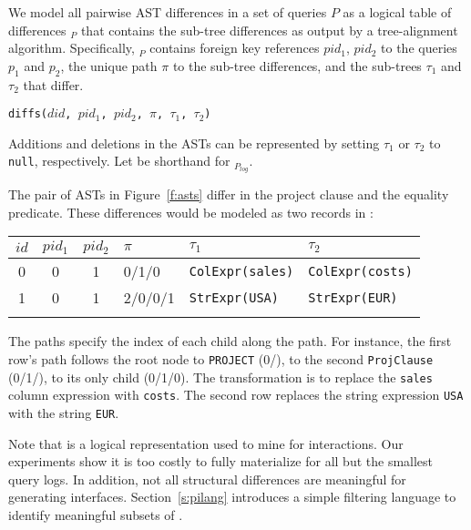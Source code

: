 We model all pairwise AST differences in a set of queries $P$ as a logical table of differences \difftablens$_P$ that contains the sub-tree differences as output by a tree-alignment algorithm.  Specifically, \difftablens$_P$ contains foreign key references $pid_1$, $pid_2$ to the queries $p_1$ and $p_2$, the unique path $\pi$ to the sub-tree differences, and the sub-trees $\tau_1$ and $\tau_2$ that differ.
{\small
  \begin{center}
    \texttt{diffs($did$, $pid_1$, $pid_2$, $\pi$, $\tau_1$, $\tau_2$)}
  \end{center}
}
Additions and deletions in the ASTs can be represented by setting $\tau_1$ or $\tau_2$ to \texttt{null}, respectively. Let \difftable be shorthand for \difftablens$_{P_{log}}$.
\begin{example}\label{e:asts}
The pair of ASTs in Figure~\ref{f:asts} differ in the project clause and the equality predicate.  These differences would be modeled as two records in \difftable:
\begin{center}\small
\hspace*{-.1in}
        \begin{tabular}{ccclll}
            \toprule
            $id$ & \textbf{$pid_1$}  & \textbf{$pid_2$}    & \textbf{$\pi$}& \textbf{$\tau_1$}& \textbf{$\tau_2$}\\
            \midrule
            0 & 0 & 1 & 0/1/0   & \texttt{ColExpr(sales)} & \texttt{ColExpr(costs)} \\
            1 & 0 & 1 & 2/0/0/1 & \texttt{StrExpr(USA)} & \texttt{StrExpr(EUR)} \\
            \bottomrule
            \\
        \end{tabular}

\end{center}
The paths specify the index of each child along the path.  For instance, the first row's path follows the root node to \texttt{PROJECT} (0/), to the second \texttt{ProjClause} (0/1/), to its only child (0/1/0).  The transformation is to replace the \texttt{sales} column expression with \texttt{costs}.  The second row replaces the string expression \texttt{USA} with the string \texttt{EUR}.
\end{example}
Note that \difftable is a logical representation used to mine for interactions.   Our experiments show it is too costly to fully materialize \difftable for all but the smallest query logs.  In addition, not all structural differences are meaningful for generating interfaces.  Section~\ref{s:pilang} introduces a simple filtering language to identify meaningful subsets of \difftable.



